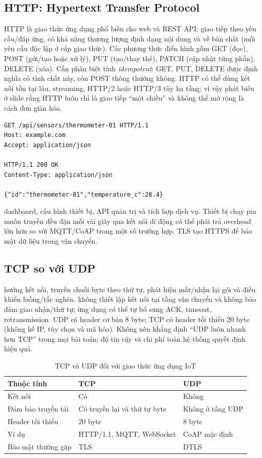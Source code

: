 \subsection{HTTP: Hypertext Transfer Protocol}
HTTP là giao thức ứng dụng phổ biến cho web và REST API; giao tiếp theo yêu cầu/đáp ứng, có khả năng thương lượng định dạng nội dung và về bản chất  (mỗi yêu cầu độc lập ở cấp giao thức). Các phương thức điển hình gồm GET (đọc), POST (gửi/tạo hoặc xử lý), PUT (tạo/thay thế), PATCH (cập nhật từng phần), DELETE (xóa). Cần phân biệt tính \emph{idempotent}: GET, PUT, DELETE được định nghĩa có tính chất này, còn POST thông thường không. HTTP có thể dùng kết nối tồn tại lâu, streaming, HTTP/2 hoặc HTTP/3 tùy hạ tầng; vì vậy phát biểu ở slide rằng HTTP luôn chỉ là giao tiếp ``một chiều'' và không thể mở rộng là cách đơn giản hóa.
\begin{verbatim}
GET /api/sensors/thermometer-01 HTTP/1.1
Host: example.com
Accept: application/json

HTTP/1.1 200 OK
Content-Type: application/json

{"id":"thermometer-01","temperature_c":28.4}
\end{verbatim}
 dashboard, cấu hình thiết bị, API quản trị và tích hợp dịch vụ. Thiết bị chạy pin muốn truyền đều đặn mỗi vài giây qua kết nối di động có thể phải trả overhead lớn hơn so với MQTT/CoAP trong một số trường hợp. TLS tạo HTTPS để bảo mật dữ liệu trong vận chuyển.
\subsection{TCP so với UDP}
 hướng kết nối, truyền chuỗi byte theo thứ tự, phát hiện mất/nhận lại gói và điều khiển luồng/tắc nghẽn.  không thiết lập kết nối tại tầng vận chuyển và không bảo đảm giao nhận/thứ tự; ứng dụng có thể tự bổ sung ACK, timeout, retransmission. UDP có header cơ bản 8 byte; TCP có header tối thiểu 20 byte (không kể IP, tùy chọn và mã hóa). Không nên khẳng định ``UDP luôn nhanh hơn TCP'' trong mọi bài toán: độ tin cậy và chi phí toàn hệ thống quyết định hiệu quả.
\begin{table}[htbp]\centering\small\caption{TCP và UDP đối với giao thức ứng dụng IoT}
\begin{tabularx}{\textwidth}{@{}p{32mm}X X@{}}\toprule
Thuộc tính & TCP & UDP\\\midrule
Kết nối & Có & Không\\
Đảm bảo truyền tải & Có truyền lại và thứ tự byte & Không ở tầng UDP\\
Header tối thiểu & 20 byte & 8 byte\\
Ví dụ & HTTP/1.1, MQTT, WebSocket & CoAP mặc định\\
Bảo mật thường gặp & TLS & DTLS\\\bottomrule
\end{tabularx}
\end{table}
